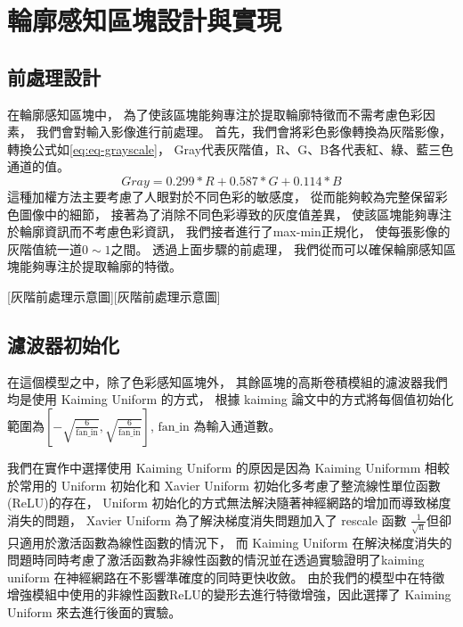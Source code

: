 \documentclass[class=NCU_thesis, crop=false]{standalone}
\begin{document}
\pagebreak
\section{輪廓感知區塊設計與實現}
	\subsection{前處理設計}
	在輪廓感知區塊中，
	為了使該區塊能夠專注於提取輪廓特徵而不需考慮色彩因素，
	我們會對輸入影像進行前處理。
	首先，我們會將彩色影像轉換為灰階影像，
	轉換公式如\cref{eq:eq-grayscale}，
	Gray代表灰階值，R、G、B各代表紅、綠、藍三色通道的值。
	\begin{equation}
	    \label{eq:eq-grayscale}
	    Gray = 0.299 * R + 0.587 * G + 0.114 * B
	\end{equation}
	這種加權方法主要考慮了人眼對於不同色彩的敏感度，
	從而能夠較為完整保留彩色圖像中的細節，
	接著為了消除不同色彩導致的灰度值差異，
	使該區塊能夠專注於輪廓資訊而不考慮色彩資訊，
	我們接者進行了max-min正規化，
	使每張影像的灰階值統一道$0\sim1$之間。
	透過上面步驟的前處理，
	我們從而可以確保輪廓感知區塊能夠專注於提取輪廓的特徵。

	[灰階前處理示意圖][灰階前處理示意圖]

	\subsection{濾波器初始化}
	在這個模型之中，除了色彩感知區塊外，
	其餘區塊的高斯卷積模組的濾波器我們均是使用 Kaiming Uniform 的方式，
	根據 kaiming 論文\cite{DBLP:journals/corr/HeZR015}中的方式將每個值初始化範圍為$[-\sqrt{\frac{6}{\text{fan\_in}}}, \sqrt{\frac{6}{\text{fan\_in}}}]$,
	$\text{fan\_in}$ 為輸入通道數。

	我們在實作中選擇使用 Kaiming Uniform 的原因是因為 Kaiming Uniformm 相較於常用的 Uniform 初始化和 Xavier Uniform\cite{pmlr-v9-glorot10a} 初始化多考慮了整流線性單位函數(ReLU)的存在，
	Uniform 初始化的方式無法解決隨著神經網路的增加而導致梯度消失的問題，
	Xavier Uniform 為了解決梯度消失問題加入了 rescale 函數 $\frac{1}{\sqrt{\text{n}}}$但卻只適用於激活函數為線性函數的情況下，
	而 Kaiming Uniform 在解決梯度消失的問題時同時考慮了激活函數為非線性函數的情況並在\cite{DBLP:journals/corr/HeZR015}透過實驗證明了kaiming uniform 在神經網路在不影響準確度的同時更快收斂。
	由於我們的模型中在特徵增強模組中使用的非線性函數ReLU的變形去進行特徵增強，因此選擇了 Kaiming Uniform 來去進行後面的實驗。

	\pagebreak
\end{document}
